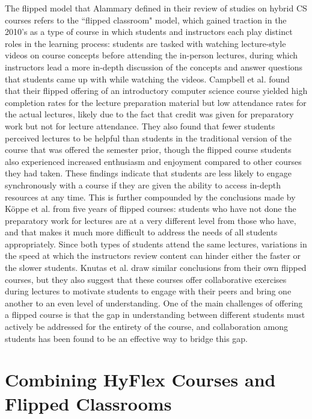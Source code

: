 The flipped model that Alammary defined in their review of studies on hybrid CS courses refers to the ``flipped classroom" model, which gained traction in the 2010's as a type of course in which students and instructors each play distinct roles in the learning process: students are tasked with watching lecture-style videos on course concepts before attending the in-person lectures, during which instructors lead a more in-depth discussion of the concepts and answer questions that students came up with while watching the videos. Campbell et al. \cite{campbell2014evaluating} found that their flipped offering of an introductory computer science course yielded high completion rates for the lecture preparation material but low attendance rates for the actual lectures, likely due to the fact that credit was given for preparatory work but not for lecture attendance. They also found that fewer students perceived lectures to be helpful than students in the traditional version of the course that was offered the semester prior, though the flipped course students also experienced increased enthusiasm and enjoyment compared to other courses they had taken. These findings indicate that students are less likely to engage synchronously with a course if they are given the ability to access in-depth resources at any time. This is further compounded by the conclusions made by K\"{o}ppe et al. \cite{koppe2015flipped} from five years of flipped courses: students who have not done the preparatory work for lectures are at a very different level from those who have, and that makes it much more difficult to address the needs of all students appropriately. Since both types of students attend the same lectures, variations in the speed at which the instructors review content can hinder either the faster or the slower students. Knutas et al. \cite{knutas2016flipped} draw similar conclusions from their own flipped courses, but they also suggest that these courses offer collaborative exercises during lectures to motivate students to engage with their peers and bring one another to an even level of understanding. One of the main challenges of offering a flipped course is that the gap in understanding between different students must actively be addressed for the entirety of the course, and collaboration among students has been found to be an effective way to bridge this gap.

\section{Combining HyFlex Courses and Flipped Classrooms}


